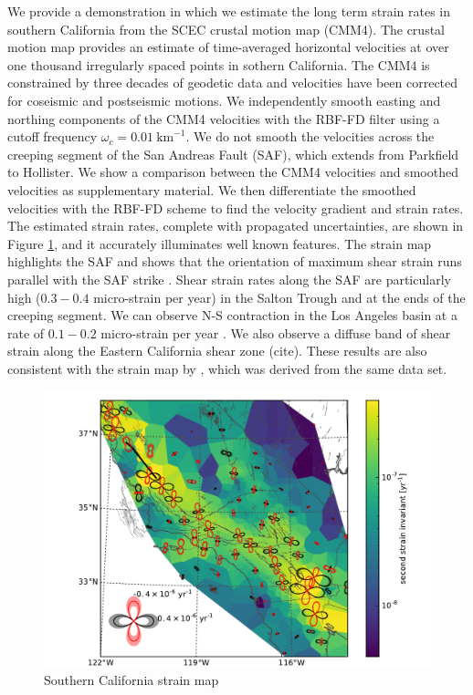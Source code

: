 \documentclass[10pt,a4paper]{article}
\begin{document}
We provide a demonstration in which we estimate the long term strain rates in southern California from the SCEC crustal motion map (CMM4)\citep{Shen2011}.  The crustal motion map provides an estimate of time-averaged horizontal velocities at over one thousand irregularly spaced points in sothern California.  The CMM4 is constrained by three decades of geodetic data and velocities have been corrected for coseismic and postseismic motions.  We independently smooth easting and northing components of the CMM4 velocities with the RBF-FD filter using a cutoff frequency $\omega_c=0.01\ \mathrm{km}^{-1}$. We do not smooth the velocities across the creeping segment of the San Andreas Fault (SAF), which extends from Parkfield to Hollister.  We show a comparison between the CMM4 velocities and smoothed velocities as supplementary material. We then differentiate the smoothed velocities with the RBF-FD scheme to find the velocity gradient and strain rates.  The estimated strain rates, complete with propagated uncertainties, are shown in Figure \ref{fig:SoCal1}, and it accurately illuminates well known features.  The strain map highlights the SAF and shows that the orientation of maximum shear strain runs parallel with the SAF strike \citep{Lisowski1991}.  Shear strain rates along the SAF are particularly high ($0.3-0.4$ micro-strain per year) in the Salton Trough and at the ends of the creeping segment. We can observe N-S contraction in the Los Angeles basin at a rate of $0.1-0.2$ micro-strain per year \citep{Shen1996,Argus1999,Argus2005}. We also observe a diffuse band of shear strain along the Eastern California shear zone (cite). These results are also consistent with the strain map by \citet{Shen2015}, which was derived from the same data set. 

\begin{figure}
\includegraphics[scale=1.0]{figures/figure5}
\caption{Southern California strain map}   
\label{fig:SoCal1}
\end{figure}
\end{document}
